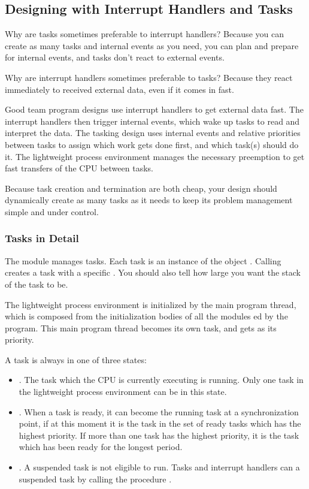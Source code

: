 \subsection{Designing with Interrupt Handlers and Tasks}

Why are tasks sometimes preferable to interrupt handlers?  Because you 
can create as
many tasks and internal events as you need, you can plan and prepare for
internal events, and tasks don't react to external events.

Why are interrupt handlers sometimes preferable to tasks?  Because they 
react immediately
to received external data, even if it comes in fast.

Good team program designs use interrupt handlers to get external data fast.
The interrupt handlers then trigger internal events, which wake up tasks
to read and interpret the data.  The tasking design uses internal events
and relative priorities between tasks to assign which work gets done first,
and which task(s) should do it.  The lightweight process environment manages
the necessary preemption to get fast transfers of the CPU between tasks.

Because task creation and termination are both cheap, your design should 
dynamically
create as many tasks as it needs to keep its problem management simple and
under control.

\subsubsection{Tasks in Detail}

The module  manages tasks.  Each task is an instance of the
object .  Calling  creates a task
with a specific .  You should also tell 
how large you want the stack of the task to be.

The lightweight process environment is initialized by the main program
thread, which is composed from the initialization bodies of all the modules
ed by the program.  This main program thread becomes its own
task, and gets  as its priority.

A task is always in one of three states:
\begin{itemize}
\item
 .  The task which the CPU is currently executing is
 running.  Only one task in the lightweight process environment
 can be in this state.
\item
 .  When a task is ready, it can become the running task
 at a synchronization point, if at this moment it is the task in the set
 of ready tasks which has the highest priority. If more than one task
 has the highest priority, it is the task which has been ready for the
 longest period.
\item
 .  A suspended task is not eligible to run.  Tasks
 and interrupt handlers can  a
 suspended task by calling the procedure .
\end{itemize}

